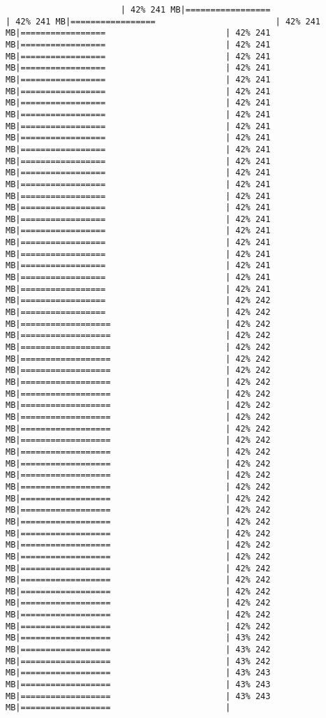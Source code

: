 \documentclass[
]{article}
\begin{document}
\begin{verbatim}
                       | 42% 241 MB|=================                        | 42% 241 MB|=================                        | 42% 241 MB|=================                        | 42% 241 MB|=================                        | 42% 241 MB|=================                        | 42% 241 MB|=================                        | 42% 241 MB|=================                        | 42% 241 MB|=================                        | 42% 241 MB|=================                        | 42% 241 MB|=================                        | 42% 241 MB|=================                        | 42% 241 MB|=================                        | 42% 241 MB|=================                        | 42% 241 MB|=================                        | 42% 241 MB|=================                        | 42% 241 MB|=================                        | 42% 241 MB|=================                        | 42% 241 MB|=================                        | 42% 241 MB|=================                        | 42% 241 MB|=================                        | 42% 241 MB|=================                        | 42% 241 MB|=================                        | 42% 241 MB|=================                        | 42% 241 MB|=================                        | 42% 241 MB|=================                        | 42% 241 MB|=================                        | 42% 242 MB|=================                        | 42% 242 MB|==================                       | 42% 242 MB|==================                       | 42% 242 MB|==================                       | 42% 242 MB|==================                       | 42% 242 MB|==================                       | 42% 242 MB|==================                       | 42% 242 MB|==================                       | 42% 242 MB|==================                       | 42% 242 MB|==================                       | 42% 242 MB|==================                       | 42% 242 MB|==================                       | 42% 242 MB|==================                       | 42% 242 MB|==================                       | 42% 242 MB|==================                       | 42% 242 MB|==================                       | 42% 242 MB|==================                       | 42% 242 MB|==================                       | 42% 242 MB|==================                       | 42% 242 MB|==================                       | 42% 242 MB|==================                       | 42% 242 MB|==================                       | 42% 242 MB|==================                       | 42% 242 MB|==================                       | 42% 242 MB|==================                       | 42% 242 MB|==================                       | 42% 242 MB|==================                       | 42% 242 MB|==================                       | 42% 242 MB|==================                       | 43% 242 MB|==================                       | 43% 242 MB|==================                       | 43% 242 MB|==================                       | 43% 243 MB|==================                       | 43% 243 MB|==================                       | 43% 243 MB|==================                       | 
\end{verbatim}
\end{document}
